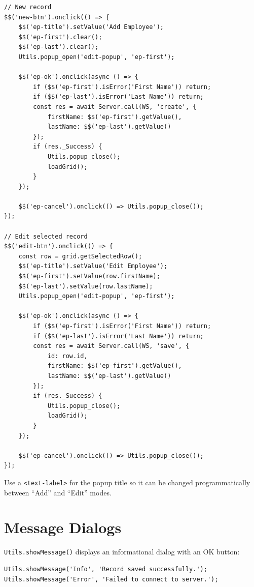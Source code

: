 \begin{lstlisting}[style=javascript]
// New record
$$('new-btn').onclick(() => {
    $$('ep-title').setValue('Add Employee');
    $$('ep-first').clear();
    $$('ep-last').clear();
    Utils.popup_open('edit-popup', 'ep-first');

    $$('ep-ok').onclick(async () => {
        if ($$('ep-first').isError('First Name')) return;
        if ($$('ep-last').isError('Last Name')) return;
        const res = await Server.call(WS, 'create', {
            firstName: $$('ep-first').getValue(),
            lastName: $$('ep-last').getValue()
        });
        if (res._Success) {
            Utils.popup_close();
            loadGrid();
        }
    });

    $$('ep-cancel').onclick(() => Utils.popup_close());
});

// Edit selected record
$$('edit-btn').onclick(() => {
    const row = grid.getSelectedRow();
    $$('ep-title').setValue('Edit Employee');
    $$('ep-first').setValue(row.firstName);
    $$('ep-last').setValue(row.lastName);
    Utils.popup_open('edit-popup', 'ep-first');

    $$('ep-ok').onclick(async () => {
        if ($$('ep-first').isError('First Name')) return;
        if ($$('ep-last').isError('Last Name')) return;
        const res = await Server.call(WS, 'save', {
            id: row.id,
            firstName: $$('ep-first').getValue(),
            lastName: $$('ep-last').getValue()
        });
        if (res._Success) {
            Utils.popup_close();
            loadGrid();
        }
    });

    $$('ep-cancel').onclick(() => Utils.popup_close());
});
\end{lstlisting}

\begin{tipbox}
Use a \texttt{<text-label>} for the popup title so it can be changed programmatically between ``Add'' and ``Edit'' modes.
\end{tipbox}

\section{Message Dialogs}
\label{sec:popup-message}

\texttt{Utils.showMessage()} displays an informational dialog with an OK button:

\begin{lstlisting}[style=javascript]
Utils.showMessage('Info', 'Record saved successfully.');
Utils.showMessage('Error', 'Failed to connect to server.');
\end{lstlisting}

